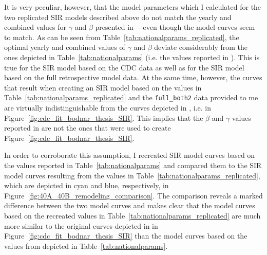 \documentclass[11pt, a4paper,twoside]{report}\usepackage[]{graphicx}\usepackage[]{color}
\begin{document}
It is very peculiar, however, that the model parameters which I calculated for the two replicated SIR models described above do not match the yearly and combined values for $\gamma$ and $\beta$ presented in \citep{bodnar_data_2015}---even though the model curves seem to match. As can be seen from Table~\ref{tab:nationalparams_replicated}, the optimal yearly and combined values of $\gamma$ and $\beta$ deviate considerably from the ones depicted in Table~\ref{tab:nationalparams} (i.e. the values reported in \citep{bodnar_data_2015}). This is true for the SIR model based on the CDC data as well as for the SIR model based on the full retrospective model data. At the same time, however, the curves that result when creating an SIR model based on the values in Table~\ref{tab:nationalparams_replicated} and the \texttt{full\_both2} data provided to me are virtually indistinguishable from the curves depicted in \cite{bodnar_data_2015}, i.e. in Figure~\ref{fig:cdc_fit_bodnar_thesis_SIR}. This implies that the $\beta$ and $\gamma$ values reported in \cite{bodnar_data_2015} are not the ones that were used to create Figure~\ref{fig:cdc_fit_bodnar_thesis_SIR}.

In order to corroborate this assumption, I recreated SIR model curves based on the values reported in Table~\ref{tab:nationalparams} and compared them to the SIR model curves resulting from the values in Table~\ref{tab:nationalparams_replicated}, which are depicted in cyan and blue, respectively, in Figure~\ref{fig:40A_40B_remodeling_comparison}. The comparison reveals a marked difference between the two model curves and makes clear that the model curves based on the recreated values in Table~\ref{tab:nationalparams_replicated} are much more similar to the original curves depicted in in Figure~\ref{fig:cdc_fit_bodnar_thesis_SIR} than the model curves based on the values from \cite{bodnar_data_2015} depicted in Table~\ref{tab:nationalparams}.
\end{document}
